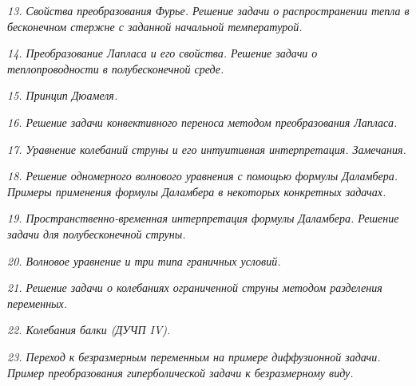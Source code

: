 \emph{13. Свойства преобразования Фурье. Решение задачи о распространении тепла
в бесконечном стержне с заданной начальной температурой.}

\newpage %

\emph{14. Преобразование Лапласа и его свойства. Решение задачи о
теплопроводности в полубесконечной среде.}

\newpage %

\emph{15. Принцип Дюамеля.}

\newpage %

\emph{16. Решение задачи конвективного переноса методом преобразования Лапласа.}

\newpage %

\emph{17. Уравнение колебаний струны и его интуитивная интерпретация.
Замечания.}

\newpage %

\emph{18. Решение одномерного волнового уравнения с помощью формулы Даламбера.
Примеры применения формулы Даламбера в некоторых конкретных задачах.}

\newpage %

\emph{19. Пространственно-временная интерпретация формулы Даламбера. Решение
задачи для полубесконечной струны.}

\newpage %

\emph{20. Волновое уравнение и три типа граничных условий.}

\newpage %

\emph{21. Решение задачи о колебаниях ограниченной струны методом разделения
переменных.}

\newpage %

\emph{22. Колебания балки (ДУЧП IV).}

\newpage %

\emph{23. Переход к безразмерным переменным на примере диффузионной задачи.
Пример преобразования гиперболической задачи к безразмерному виду.}

